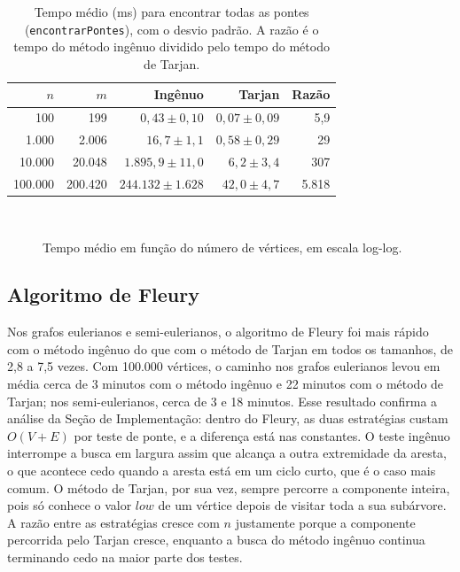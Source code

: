 \begin{table}[H]
  \centering
  \caption{Tempo médio (ms) para encontrar todas as pontes (\texttt{encontrarPontes}), com o desvio padrão. A razão é o tempo do método ingênuo dividido pelo tempo do método de Tarjan.}
  \label{tab:pontes}
  \begin{tabular}{rrrrr}
    \toprule
    $n$ & $m$ & Ingênuo & Tarjan & Razão \\
    \midrule
    100     & 199    & $0{,}43 \pm 0{,}10$       & $0{,}07 \pm 0{,}09$ & 5,9 \\
    1.000   & 2.006  & $16{,}7 \pm 1{,}1$        & $0{,}58 \pm 0{,}29$ & 29 \\
    10.000  & 20.048 & $1.895{,}9 \pm 11{,}0$    & $6{,}2 \pm 3{,}4$   & 307 \\
    100.000 & 200.420 & $244.132 \pm 1.628$     & $42{,}0 \pm 4{,}7$  & 5.818 \\
    \bottomrule
  \end{tabular}
\end{table}

\begin{figure}[H]
  \centering
  \hfill
  \\[1em]
  \caption{Tempo médio em função do número de vértices, em escala log-log.}
  \label{fig:tempos}
\end{figure}

\subsection{Algoritmo de Fleury}

Nos grafos eulerianos e semi-eulerianos, o algoritmo de Fleury foi mais rápido com o método ingênuo do que com o método de Tarjan em todos os tamanhos, de 2,8 a 7,5 vezes. Com 100.000 vértices, o caminho nos grafos eulerianos levou em média cerca de 3 minutos com o método ingênuo e 22 minutos com o método de Tarjan; nos semi-eulerianos, cerca de 3 e 18 minutos. Esse resultado confirma a análise da Seção de Implementação: dentro do Fleury, as duas estratégias custam $O(V + E)$ por teste de ponte, e a diferença está nas constantes. O teste ingênuo interrompe a busca em largura assim que alcança a outra extremidade da aresta, o que acontece cedo quando a aresta está em um ciclo curto, que é o caso mais comum. O método de Tarjan, por sua vez, sempre percorre a componente inteira, pois só conhece o valor $low$ de um vértice depois de visitar toda a sua subárvore. A razão entre as estratégias cresce com $n$ justamente porque a componente percorrida pelo Tarjan cresce, enquanto a busca do método ingênuo continua terminando cedo na maior parte dos testes.

